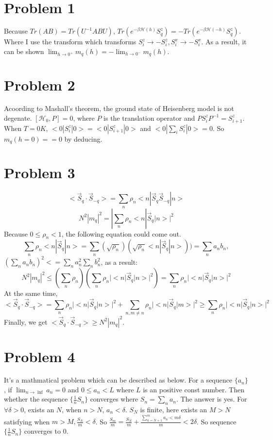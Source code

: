 \documentclass[UTF8]{article}
\begin{document}
\section{Problem 1}
Because $Tr(AB)=Tr(U^{-1}ABU)$, $Tr(e^{-\beta\mathcal{H}(h)}S^z_q)=-Tr(e^{-\beta\mathcal{H}(-h)}S^z_q)$. Where I use the transform which transforms $S^z_i\rightarrow -S^z_i,S^x_i\rightarrow -S^x_i$. As a result, it can be shown $\lim_{h\to 0^+}m_q(h)=-\lim_{h\to 0^-}m_q(h)$.

\section{Problem 2}
Acoording to Mashall's theorem, the ground state of Heisenberg model is not degenate. $[\mathcal{H}_0,P]=0$, where $P$ is the translation operator and $PS_i^zP^{-1}=S_{i+1}^z$. When $T=0K$, $<0|S_i^z|0>=<0|S_{i+1}^z|0>$ and $<0|\sum_{i}S_i^z|0>=0$. So $m_q(h=0)==0$ by deducing.

\section{Problem 3}
\begin{equation}
\label{1}
<\vec{S}_q\cdot \vec{S}_{-q}>=\sum_{n}\rho_n<n|\vec{S}_q\vec{S}_{-q}|n>
\end{equation}
\begin{equation}
\label{2}
N^2|m_q|^2=|\sum_{n}\rho_n<n|\vec{S}_q|n>|^2
\end{equation}
Because $0\le\rho_n<1$, the following equation could come out.
\begin{equation}
\sum_{n}\rho_n<n|\vec{S}_q|n>=\sum_{n}(\sqrt{\rho_n})(\sqrt{\rho_n}<n|\vec{S}_q|n>))=\sum_{n}a_nb_n,
\end{equation}
$(\sum_{n}a_nb_n)^2<=\sum_{n}a_n^2\sum_{n}b_n^2$, as a result:
\begin{equation}
\label{3}
N^2|m_q|^2\le (\sum_{n}\rho_n)(\sum_{n}\rho_n|<n|\vec{S}_q|n>|^2)=\sum_{n}\rho_n|<n|\vec{S}_q|n>|^2
\end{equation}
At the same time,
\begin{equation}
\label{4}
<\vec{S}_q\cdot \vec{S}_{-q}>=\sum_{n}\rho_n|<n|\vec{S}_q|n>|^2+\sum_{n,m\ne n}\rho_n|<n|\vec{S}_q|m>|^2\ge \sum_{n}\rho_n|<n|\vec{S}_q|n>|^2
\end{equation}
Finally, we get $<\vec{S}_q\cdot \vec{S}_{-q}>\ge N^2|m_q|^2$. 

\section{Problem 4}
It's a mathmatical problem which can be described as below. For a sequence $\{a_n\}$, if $\lim_{n\to \inf}a_n=0$ and $0\le a_n<L$ where $L$ is an positive const number. Then whether the sequence $\{\frac{1}{n}S_n\}$ converges where $S_n=\sum_{n}a_n$. The answer is yes. For $\forall \delta>0$, exists an $N$, when $n>N$, $a_n<\delta$. $S_N$ is finite, here exists an $M>N$ satisfying when $m>M,\frac{S_N}{m}<\delta$. So $\frac{S_m}{m}=\frac{S_N}{m}+\frac{\sum_{n=N+1}^{m}a_n<m \delta}{m}<2\delta$. So sequence $ \{\frac{1}{n}S_n\}$ converges to 0.
\end{document}
